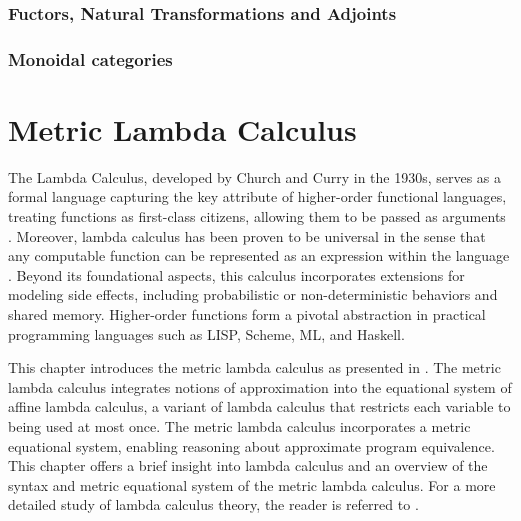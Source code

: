\subsection{Fuctors, Natural Transformations and Adjoints}




\subsection{Monoidal categories}

 





\chapter{Metric Lambda Calculus} \label{ch:metriclambda}


The Lambda Calculus, developed by Church and Curry in the 1930s, serves as a formal language capturing the key attribute of higher-order functional languages, treating functions as first-class citizens, allowing them to be passed as arguments \cite{barendregt1984lambda}.  Moreover, lambda calculus has been proven to be universal in the sense that any computable function can be represented as an expression within the language \cite{bernays1936alonzo} . Beyond its foundational aspects, this calculus incorporates extensions for modeling side effects, including probabilistic or non-deterministic behaviors and shared memory.  Higher-order functions form a pivotal abstraction in practical programming languages such as LISP, Scheme, ML, and Haskell.


This chapter introduces the metric lambda calculus as presented in \cite{dahlqvist2022syntactic}. The metric lambda calculus integrates notions of
approximation into the equational system of affine lambda calculus, a variant of lambda calculus that restricts each variable to being used at most once. The metric lambda calculus incorporates a metric equational system, enabling reasoning about approximate program equivalence. This chapter offers a brief insight into lambda calculus and an overview of the syntax and metric equational system of the metric lambda calculus. For a more detailed study of lambda calculus theory, the reader is referred to \cite{barendregt1984lambda}.


